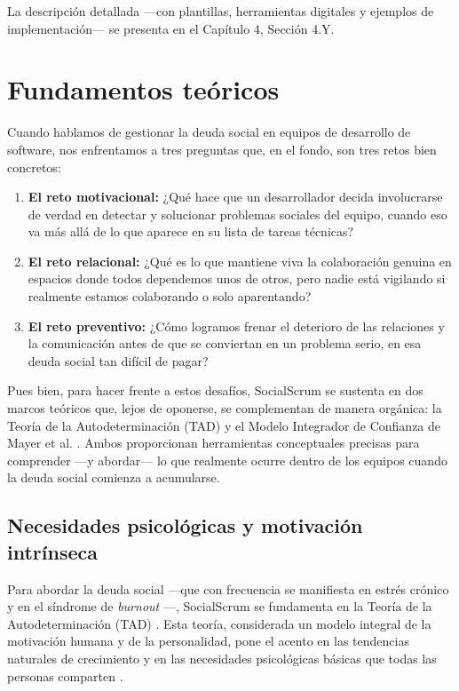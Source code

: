 La descripción detallada —con plantillas, herramientas digitales y ejemplos de implementación— se presenta en el Capítulo 4, Sección 4.Y.

\FloatBarrier

\section{Fundamentos teóricos}

Cuando hablamos de gestionar la deuda social en equipos de desarrollo de software, nos enfrentamos a tres preguntas que, en el fondo, son tres retos bien concretos:

\begin{enumerate}
    \item \textbf{El reto motivacional:} ¿Qué hace que un desarrollador decida involucrarse de verdad en detectar y solucionar problemas sociales del equipo, cuando eso va más allá de lo que aparece en su lista de tareas técnicas?
    \item \textbf{El reto relacional:} ¿Qué es lo que mantiene viva la colaboración genuina en espacios donde todos dependemos unos de otros, pero nadie está vigilando si realmente estamos colaborando o solo aparentando?
    \item \textbf{El reto preventivo:} ¿Cómo logramos frenar el deterioro de las relaciones y la comunicación antes de que se conviertan en un problema serio, en esa deuda social tan difícil de pagar?
\end{enumerate}

Pues bien, para hacer frente a estos desafíos, SocialScrum se sustenta en dos marcos teóricos que, lejos de oponerse, se complementan de manera orgánica: la Teoría de la Autodeterminación (TAD) \cite{ryan_self-determination_2000} y el Modelo Integrador de Confianza de Mayer et al. \cite{mayer_integrative_1995}. Ambos proporcionan herramientas conceptuales precisas para comprender —y abordar— lo que realmente ocurre dentro de los equipos cuando la deuda social comienza a acumularse.

\subsection{Necesidades psicológicas y motivación intrínseca}

Para abordar la deuda social —que con frecuencia se manifiesta en estrés crónico y en el síndrome de \textit{burnout} \cite{wilson_all_2006,tulili2022burnout}—, SocialScrum se fundamenta en la Teoría de la Autodeterminación (TAD) \cite{ryan_self-determination_2000}.
Esta teoría, considerada un modelo integral de la motivación humana y de la personalidad, pone el acento en las tendencias naturales de crecimiento y en las necesidades psicológicas básicas que todas las personas comparten \cite{ryan_self-determination_2000}.

